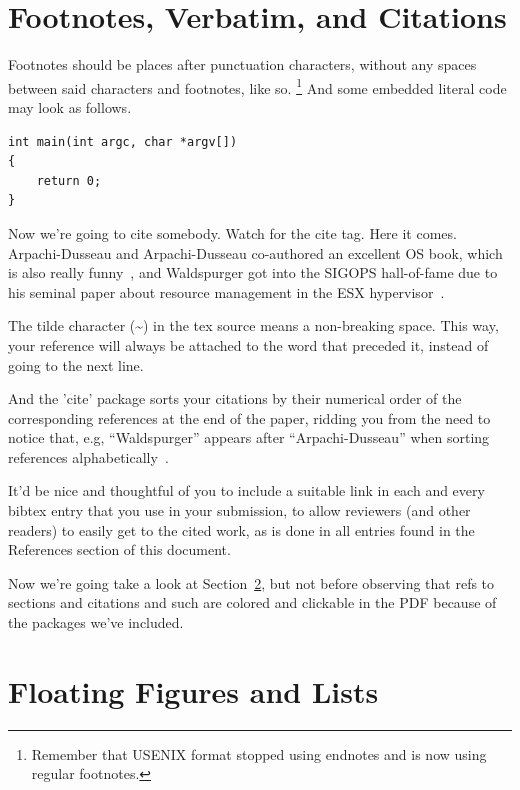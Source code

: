 \section{Footnotes, Verbatim, and Citations}

Footnotes should be places after punctuation characters, without any
spaces between said characters and footnotes, like so.%
\footnote{Remember that USENIX format stopped using endnotes and is
  now using regular footnotes.} And some embedded literal code may
look as follows.

\begin{verbatim}
int main(int argc, char *argv[]) 
{
    return 0;
}
\end{verbatim}

Now we're going to cite somebody. Watch for the cite tag. Here it
comes. Arpachi-Dusseau and Arpachi-Dusseau co-authored an excellent OS
book, which is also really funny~\cite{arpachiDusseau18:osbook}, and
Waldspurger got into the SIGOPS hall-of-fame due to his seminal paper
about resource management in the ESX hypervisor~\cite{waldspurger02}.

The tilde character (\~{}) in the tex source means a non-breaking
space. This way, your reference will always be attached to the word
that preceded it, instead of going to the next line.

And the 'cite' package sorts your citations by their numerical order
of the corresponding references at the end of the paper, ridding you
from the need to notice that, e.g, ``Waldspurger'' appears after
``Arpachi-Dusseau'' when sorting references
alphabetically~\cite{waldspurger02,arpachiDusseau18:osbook}. 

It'd be nice and thoughtful of you to include a suitable link in each
and every bibtex entry that you use in your submission, to allow
reviewers (and other readers) to easily get to the cited work, as is
done in all entries found in the References section of this document.

Now we're going take a look at Section~\ref{sec:figs}, but not before
observing that refs to sections and citations and such are colored and
clickable in the PDF because of the packages we've included.

\section{Floating Figures and Lists}
\label{sec:figs}

